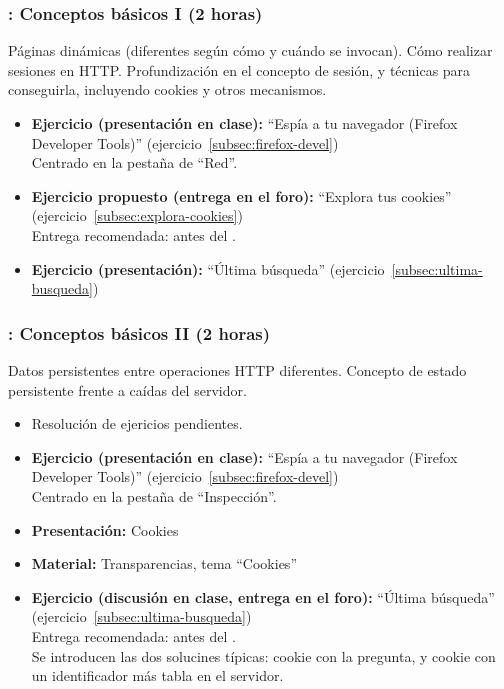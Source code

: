 \documentclass[a4paper,12pt]{article}
\begin{document}
\subsubsection{\martesB: Conceptos básicos I (2 horas)}
\label{cal:martesB}

Páginas dinámicas (diferentes según cómo y cuándo se invocan). Cómo realizar sesiones en HTTP. Profundización en el concepto de sesión, y técnicas para conseguirla, incluyendo cookies y otros mecanismos.

\begin{itemize}
\item \textbf{Ejercicio (presentación en clase):} ``Espía a tu navegador (Firefox Developer Tools)'' (ejercicio~\ref{subsec:firefox-devel}) \\
  Centrado en la pestaña de ``Red''.
\item \textbf{Ejercicio propuesto (entrega en el foro):} ``Explora tus cookies'' (ejercicio~\ref{subsec:explora-cookies}) \\
  Entrega recomendada: antes del \juevesB.
\item \textbf{Ejercicio (presentación):} ``Última búsqueda'' (ejercicio~\ref{subsec:ultima-busqueda})
\end{itemize}


\subsubsection{\martesC: Conceptos básicos II (2 horas)}
\label{cal:martesC}

Datos persistentes entre operaciones HTTP diferentes. Concepto de estado persistente frente a caídas del servidor.

\begin{itemize}
\item Resolución de ejericios pendientes.
\item \textbf{Ejercicio (presentación en clase):} ``Espía a tu navegador (Firefox Developer Tools)'' (ejercicio~\ref{subsec:firefox-devel}) \\
  Centrado en la pestaña de ``Inspección''.
\item \textbf{Presentación:} Cookies
\item \textbf{Material:} Transparencias, tema ``Cookies''
\item \textbf{Ejercicio (discusión en clase, entrega en el foro):} ``Última búsqueda'' (ejercicio~\ref{subsec:ultima-busqueda}) \\
  Entrega recomendada: antes del \juevesC. \\
  Se introducen las dos solucines típicas: cookie con la pregunta, y cookie con un identificador más tabla en el servidor.
\end{itemize}
\end{document}
